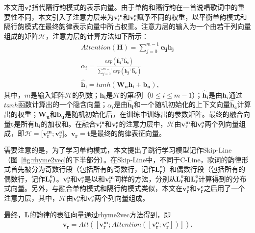 本文用$\bm {v_r^a}$指代隔行韵模式的表示向量。由于单韵和隔行韵在一首说唱歌词中的重要性不同，本文引入了注意力层来为$\bm {v_r^m}$和$\bm {v_r^a}$赋予不同的权重，以平衡单韵模式和隔行韵模式在最终韵律表示向量中所占权重。注意力层的输入为一个由若干列向量组成的矩阵$\bm{\mathcal{H}}$，注意力层的计算方法如下所示：
\begin{equation}
  \begin{gathered}
  \label{eq:att}
  Attention(\bm {H}) = \sum_{j=0}^{m-1}{\bm{\alpha{_j} h{_j}}}\\
  \alpha_i= \frac{exp\left( \bm{\hat{h}{_i}^{\top } \hat{h}_{c}}\right) }{\sum_{j=0}^{m-1}{exp\left( \bm {\hat{h}{_j}^\top \hat{h}_{c}} \right) } }\\
\bm{\hat{h}_i}= tanh(\bm {W_u}\bm{h_i}+\bm{b_u}),
  \end{gathered}
\end{equation}
其中，$m$是输入矩阵$\bm{\mathcal{H}}$的列数；$\bm {h_i}$是$\bm{\mathcal{H}}$的第$i$列（$0 \leq i \leq m-1$）；$\bm {\hat{h}_i} $是由$\bm h_i$通过$tanh$函数计算出的一个隐含向量；$\alpha_i$是由$\bm {\hat{h}_i}$和一个随机初始化的上下文向量$\bm{\hat{h}_{c}}$计算出的权重；$\bm {W_u}$和$\bm {b_u}$是随机初始化后，在训练中训练出的参数矩阵。最终的融合向量$\bm t$是所有$\bm {h_i}$的加权和。在融合$\bm {v_r^m}$和$\bm {v_r^a}$的注意力层中，$\bm{\mathcal{H}}$由$\bm {v_r^m}$和$\bm {v_r^a}$两个列向量组成，即$\bm{\mathcal{H}=[\bm {v_r^m}; \bm {v_r^a}}]$。$\bm {v_r}= \bm{t}$是最终的韵律表征向量。\par

需要注意的是，为了学习单韵模式，本文提出了跳行学习模型记作Skip-Line（图~\ref{fig:rhyme2vec}的下半部分）。在Skip-Line中，不同于C-Line，歌词的韵律形式首先被分为奇数行段（包括所有的奇数行，记作$\bm{L_r^o}$）和偶数行段（包括所有的偶数行，记作$\bm{L_r^e}$）。$\bm{v_r^o}$和$ \bm{v_r^e}$是以和$\bm{v_r^m}$同样的方法，分别从$\bm{L_r^o}$和$\bm{L_r^e}$计算得到的分布式向量。另外，与融合单韵模式和隔行韵模式类似，本文在$\bm{v_r^o}$和$\bm{v_r^e}$之后用了一个注意力层，其中，$\bm{\mathcal{H}}$由$\bm{v_r^o}$和$\bm{v_r^e}$两个列向量组成。\par

最终，$\bm {L}$的韵律的表征向量通过rhyme2vec方法得到，即
\begin{equation}
  \begin{gathered}
  \label{eq:vr}
  \bm{v_r}=Att([\bm {v_r^m}; Attention([\bm{v_r^o}; \bm{v_r^e}])]).
  \end{gathered}
\end{equation}
\par

